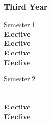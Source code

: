 \subsubsection{Third Year}
\begin{center}
\begin{multicols}{2}
Semester 1 \\
\textbf{Elective} \\
\textbf{Elective} \\
\textbf{Elective} \\
\textbf{Elective} \\
\vfill
\columnbreak

Semester 2 \\
 \\
 \\
\textbf{Elective} \\
\textbf{Elective} \\
\end{multicols}
\end{center}